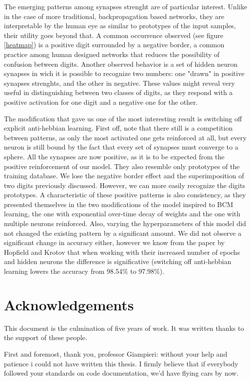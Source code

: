 \documentclass[a4paper]{report}
\begin{document}
The emerging patterns among synapses strenght are of particular interest. Unlike in the case of more traditional, backpropagation based networks, they are interpretable by the human eye as similar to prototypes of the input samples, their utility goes beyond that. A common occurrence observed (see figure \ref{heatmap}) is a positive digit surrounded by a negative border, a common practice among human designed networks that reduces the possibility of confusion between digits. Another observed behavior is a set of hidden neuron synapses in wich it is possible to recognize two numbers: one "drawn" in positive synapses strenghts, and the other in negative. These values might reveal very useful in distinguishing between two classes of digits, as they respond with a positive activation for one digit and a negative one for the other.

The modification that gave us one of the most interesting result is switching off explicit anti-hebbian learning. First off, note that there still is a competition between patterns, as only the most activated one gets reinforced at all, but every neuron is still bound by the fact that every set of synapses must converge to a sphere. All the synapses are now positive, as it is to be expected from the positive reinforcement of our model. They also resemble only prototypes of the training database. We lose the negative border effect and the superimposition of two digits previously discussed. However, we can more easily recognize the digits prototypes.  A characteristic of these positive patterns is also consistency, as they presented themselves in the two modifications of the model inspired to BCM learning, the one with exponential over-time decay of weights and the one with multiple neurons reinforced. Also, varying the hyperparameters of this model did not changed the existing pattern by a significant amount. We did not observe a significant change in accuracy either, however we know from the paper by Hopfield and Krotov that when working with their increased number of epochs and hidden neurons the difference is significative (switching off anti-hebbian learning lowers the accuracy from 98.54\% to 97.98\%).

\chapter{Acknowledgements}
This document is the culmination of five years of work. It was written thanks to the support of these people.

First and foremost, thank you, professor Giampieri: without your help and patience i could not have written this thesis. I firmly believe that if everybody followed your standards on code documentation, we'd have flying cars by now.
\end{document}
